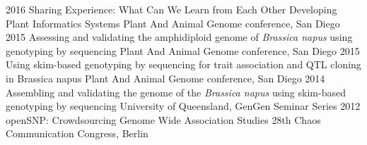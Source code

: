 \documentclass[]{friggeri-cv} %
\begin{document}
\begin{entrylist}
\entry
{2016}
{Sharing Experience: What Can We Learn from Each Other Developing Plant Informatics Systems}
{}
{Plant And Animal Genome conference, San Diego}
\entry
{2015}
{Assessing and validating the amphidiploid genome of \textit{Brassica napus} using genotyping by sequencing}
{}
{Plant And Animal Genome conference, San Diego}
\entry
{2015}
{Using skim-based genotyping by sequencing for trait association and QTL cloning in Brassica napus}
{}
{Plant And Animal Genome conference, San Diego}
\entry
{2014}
{Assembling and validating the genome of the \textit{Brassica napus} using skim-based genotyping by sequencing}
{}
{University of Queensland, GenGen Seminar Series}
\entry
{2012}
{openSNP: Crowdsourcing Genome Wide Association Studies}
{}
{28th Chaos Communication Congress, Berlin}
\end{entrylist}
\end{document}
